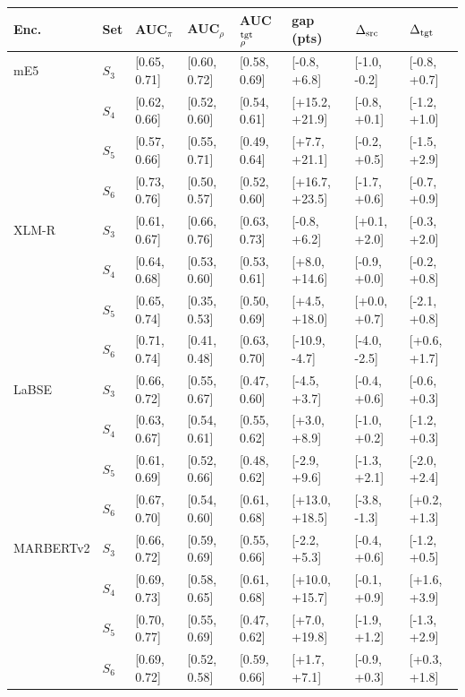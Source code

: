 \begin{tabular}{@{}llllllll@{}}\toprule
Enc. & Set & AUC$_\pi$ & AUC$_\rho$ & AUC$_\rho^{\rm tgt}$ & gap (pts) & $\Delta_{\rm src}$ & $\Delta_{\rm tgt}$\\\midrule
mE5 & $S_3$ & [0.65, 0.71] & [0.60, 0.72] & [0.58, 0.69] & [-0.8, +6.8] & [-1.0, -0.2] & [-0.8, +0.7]\\
 & $S_4$ & [0.62, 0.66] & [0.52, 0.60] & [0.54, 0.61] & [+15.2, +21.9] & [-0.8, +0.1] & [-1.2, +1.0]\\
 & $S_5$ & [0.57, 0.66] & [0.55, 0.71] & [0.49, 0.64] & [+7.7, +21.1] & [-0.2, +0.5] & [-1.5, +2.9]\\
 & $S_6$ & [0.73, 0.76] & [0.50, 0.57] & [0.52, 0.60] & [+16.7, +23.5] & [-1.7, +0.6] & [-0.7, +0.9]\\
\midrule
XLM-R & $S_3$ & [0.61, 0.67] & [0.66, 0.76] & [0.63, 0.73] & [-0.8, +6.2] & [+0.1, +2.0] & [-0.3, +2.0]\\
 & $S_4$ & [0.64, 0.68] & [0.53, 0.60] & [0.53, 0.61] & [+8.0, +14.6] & [-0.9, +0.0] & [-0.2, +0.8]\\
 & $S_5$ & [0.65, 0.74] & [0.35, 0.53] & [0.50, 0.69] & [+4.5, +18.0] & [+0.0, +0.7] & [-2.1, +0.8]\\
 & $S_6$ & [0.71, 0.74] & [0.41, 0.48] & [0.63, 0.70] & [-10.9, -4.7] & [-4.0, -2.5] & [+0.6, +1.7]\\
\midrule
LaBSE & $S_3$ & [0.66, 0.72] & [0.55, 0.67] & [0.47, 0.60] & [-4.5, +3.7] & [-0.4, +0.6] & [-0.6, +0.3]\\
 & $S_4$ & [0.63, 0.67] & [0.54, 0.61] & [0.55, 0.62] & [+3.0, +8.9] & [-1.0, +0.2] & [-1.2, +0.3]\\
 & $S_5$ & [0.61, 0.69] & [0.52, 0.66] & [0.48, 0.62] & [-2.9, +9.6] & [-1.3, +2.1] & [-2.0, +2.4]\\
 & $S_6$ & [0.67, 0.70] & [0.54, 0.60] & [0.61, 0.68] & [+13.0, +18.5] & [-3.8, -1.3] & [+0.2, +1.3]\\
\midrule
MARBERTv2 & $S_3$ & [0.66, 0.72] & [0.59, 0.69] & [0.55, 0.66] & [-2.2, +5.3] & [-0.4, +0.6] & [-1.2, +0.5]\\
 & $S_4$ & [0.69, 0.73] & [0.58, 0.65] & [0.61, 0.68] & [+10.0, +15.7] & [-0.1, +0.9] & [+1.6, +3.9]\\
 & $S_5$ & [0.70, 0.77] & [0.55, 0.69] & [0.47, 0.62] & [+7.0, +19.8] & [-1.9, +1.2] & [-1.3, +2.9]\\
 & $S_6$ & [0.69, 0.72] & [0.52, 0.58] & [0.59, 0.66] & [+1.7, +7.1] & [-0.9, +0.3] & [+0.3, +1.8]\\
\bottomrule\end{tabular}
